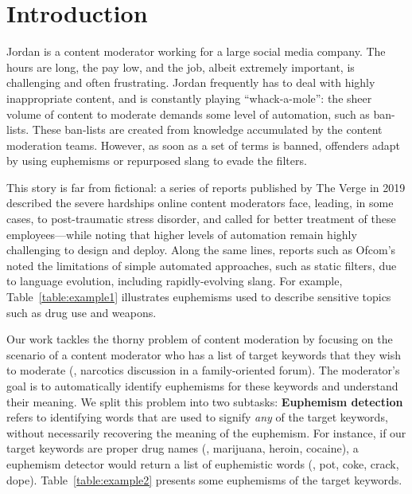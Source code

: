 \section{Introduction}
\label{sec:intro}
Jordan is a content moderator working for a large social media company. 
The hours are long, 
the pay low, 
and the job, albeit extremely important, 
is challenging and often frustrating. 
Jordan frequently has to deal with highly inappropriate content, 
and is constantly playing ``whack-a-mole'':
the sheer volume of content to moderate demands some level of automation, such as ban-lists. 
These ban-lists are created from knowledge accumulated by the content moderation teams. 
However, 
as soon as a set of terms is banned, 
offenders adapt by using euphemisms or repurposed slang to evade the filters. 

This story is far from fictional: 
a series of reports published by The Verge in 2019 \cite{TheVerge:Mods, TheVerge:Mods2} described the severe hardships online content moderators face, 
leading, 
in some cases, to post-traumatic stress disorder, 
and called for better treatment of these employees---while noting 
that higher levels of automation remain highly challenging 
to design and deploy. 
Along the same lines, 
reports such as Ofcom's~\cite{Ofcom:AI2019}
noted the limitations of simple automated approaches, 
such as static filters, due to language evolution, 
including rapidly-evolving slang. 
For example, Table~\ref{table:example1} illustrates euphemisms used to describe sensitive topics such as drug use and weapons. 

Our work tackles the thorny problem of content moderation 
by focusing on the scenario of a content moderator 
who has a list of target keywords that they wish to moderate 
(\eg, narcotics discussion in a family-oriented forum).  
The moderator's goal is to automatically identify euphemisms for these keywords and understand their meaning. 
We split this problem into two subtasks:
\textbf{Euphemism detection} refers to identifying words 
that are used to signify \emph{any} of the target keywords, 
without necessarily recovering the meaning of the euphemism. 
For instance, if our target keywords are proper drug names 
(\eg, marijuana, heroin, cocaine), a euphemism detector would return a list of euphemistic words (\eg, pot, coke, crack,  dope).
Table~\ref{table:example2} presents some euphemisms of the target keywords.  

